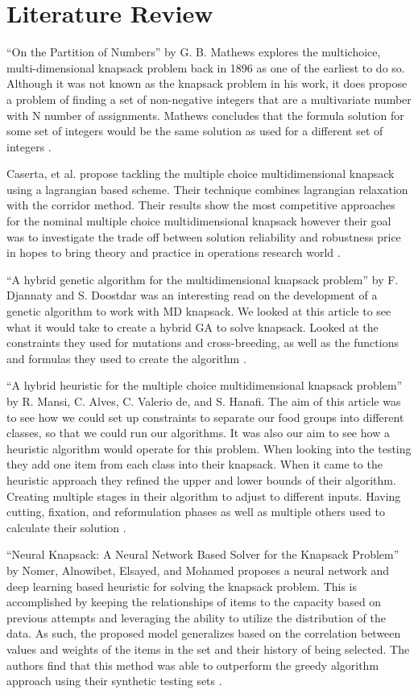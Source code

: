 \documentclass[10pt,journal,compsoc]{IEEEtran}
\begin{document}
\section{Literature Review}
“On the Partition of Numbers” by G. B. Mathews explores the multichoice,
multi-dimensional knapsack problem back in 1896 as one of the earliest to do so.
Although it was not known as the knapsack problem in his work, it does propose a
problem of finding a set of non-negative integers that are a multivariate number
with N number of assignments. Mathews concludes that the formula solution for
some set of integers would be the same solution as used for a different set of
integers \cite{mathews_partition_1896}.

Caserta, et al. propose tackling the multiple choice multidimensional knapsack
using a lagrangian based scheme. Their technique combines lagrangian relaxation
with the corridor method. Their results show the most competitive approaches for
the nominal multiple choice multidimensional knapsack however their goal was to
investigate the trade off between solution reliability and robustness price in
hopes to bring theory and practice in operations research world
\cite{caserta_robust_2019}.

“A hybrid genetic algorithm for the multidimensional knapsack problem” by F.
Djannaty and S. Doostdar was an interesting read on the development of a genetic
algorithm to work with MD knapsack. We looked at this article to see what it
would take to create a hybrid GA to solve knapsack. Looked at the constraints
they used for mutations and cross-breeding, as well as the functions and
formulas they used to create the algorithm \cite{djannaty_hybrid_2008}. 

“A hybrid heuristic for the multiple choice multidimensional knapsack problem”
by R. Mansi, C. Alves, C. Valerio de, and S. Hanafi.  The aim of this article
was to see how we could set up constraints to separate our food groups into
different classes, so that we could run our algorithms. It was also our aim to
see how a heuristic algorithm would operate for this problem. When looking into
the testing they add one item from each class into their knapsack. When it came
to the heuristic approach they refined the upper and lower bounds of their
algorithm. Creating multiple stages in their algorithm to adjust to different
inputs. Having cutting, fixation, and reformulation phases as well as multiple
others used to calculate their solution \cite{mansi_hybrid_2013}.

“Neural Knapsack: A Neural Network Based Solver for the Knapsack Problem'' by
Nomer, Alnowibet, Elsayed, and Mohamed proposes a neural network and deep
learning based heuristic for solving the knapsack problem. This is accomplished
by keeping the relationships of items to the capacity based on previous attempts
and leveraging the ability to utilize the distribution of the data. As such, the
proposed model generalizes based on the correlation between values and weights
of the items in the set and their history of being selected. The authors find
that this method was able to outperform the greedy algorithm approach using
their synthetic testing sets \cite{nomer_neural_2020}.
\end{document}
